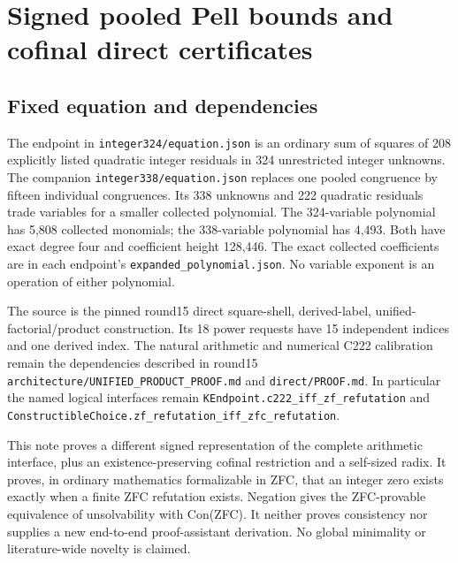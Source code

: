 \section{Signed pooled Pell bounds and cofinal direct certificates}



\subsection{Fixed equation and dependencies}



The endpoint in \texttt{integer324/\allowbreak{}equation.json} is an ordinary sum of squares of 208 explicitly listed quadratic integer residuals in 324 unrestricted integer unknowns. The companion \texttt{integer338/\allowbreak{}equation.json} replaces one pooled congruence by fifteen individual congruences. Its 338 unknowns and 222 quadratic residuals trade variables for a smaller collected polynomial. The 324-variable polynomial has 5,808 collected monomials; the 338-variable polynomial has 4,493. Both have exact degree four and coefficient height 128,446. The exact collected coefficients are in each endpoint's \texttt{expanded\_\allowbreak{}polynomial.json}. No variable exponent is an operation of either polynomial.



The source is the pinned round15 direct square-shell, derived-label, unified-factorial/\allowbreak{}product construction. Its 18 power requests have 15 independent indices and one derived index. The natural arithmetic and numerical C222 calibration remain the dependencies described in round15 \texttt{architecture/\allowbreak{}UNIFIED\_\allowbreak{}PRODUCT\_\allowbreak{}PROOF.md} and \texttt{direct/\allowbreak{}PROOF.md}. In particular the named logical interfaces remain \texttt{KEndpoint.c222\_\allowbreak{}iff\_\allowbreak{}zf\_\allowbreak{}refutation} and \texttt{ConstructibleChoice.zf\_\allowbreak{}refutation\_\allowbreak{}iff\_\allowbreak{}zfc\_\allowbreak{}refutation}.



This note proves a different signed representation of the complete arithmetic interface, plus an existence-preserving cofinal restriction and a self-sized radix. It proves, in ordinary mathematics formalizable in ZFC, that an integer zero exists exactly when a finite ZFC refutation exists. Negation gives the ZFC-provable equivalence of unsolvability with Con(ZFC). It neither proves consistency nor supplies a new end-to-end proof-assistant derivation. No global minimality or literature-wide novelty is claimed.



